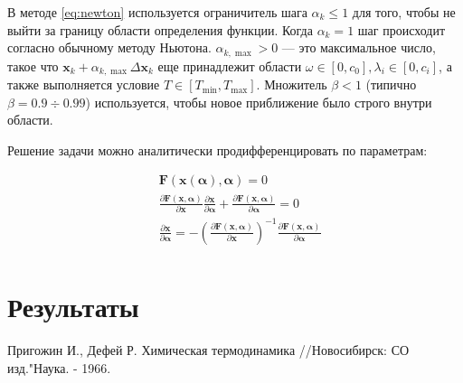 \documentclass[12pt]{article}
\newcommand{\pd}[2]{\frac{\partial #1}{\partial #2}}
\let\dividesymbol\div
\renewcommand{\div}{\operatorname{div}}
\renewcommand{\leq}{\leqslant}
\begin{document}
В методе \eqref{eq:newton} используется ограничитель шага $\alpha_k \leq 1$ для того, чтобы не выйти за границу области определения функции. Когда $\alpha_k = 1$ шаг происходит согласно обычному методу Ньютона. $\alpha_{k, \max} > 0$ --- это максимальное число, такое что $\mathbf{x}_k + \alpha_{k,\max} \Delta \mathbf{x}_{k}$ еще принадлежит области $\omega \in [0,c_0], \lambda_i \in [0, c_i]$, а также выполняется условие $T \in [T_{\min}, T_{\max}]$. Множитель $\beta < 1$ (типично $\beta = 0.9 \dividesymbol 0.99$) используется, чтобы новое приближение было строго внутри области.

Решение задачи можно аналитически продифференцировать по параметрам:

\begin{equation}
\begin{aligned}
&\mathbf{F}(\mathbf{x}(\boldsymbol \alpha), \boldsymbol \alpha) = 0\\
&\pd{\mathbf{F}(\mathbf{x}, \boldsymbol \alpha)}{\mathbf{x}} \pd{\mathbf{x}}{\boldsymbol \alpha} + \pd{\mathbf{F}(\mathbf{x}, \boldsymbol \alpha)}{\boldsymbol \alpha} = 0\\
&\pd{\mathbf{x}}{\boldsymbol \alpha} = -\left(\pd{\mathbf{F}(\mathbf{x}, \boldsymbol \alpha)}{\mathbf{x}}\right)^{-1} \pd{\mathbf{F}(\mathbf{x}, \boldsymbol \alpha)}{\boldsymbol \alpha} \\
\end{aligned}
\end{equation}

\section{Результаты}

\newpage

\begin{thebibliography}{9}
     Пригожин И., Дефей Р. Химическая термодинамика //Новосибирск: СО изд."Наука. - 1966.
\end{thebibliography}
\end{document}
